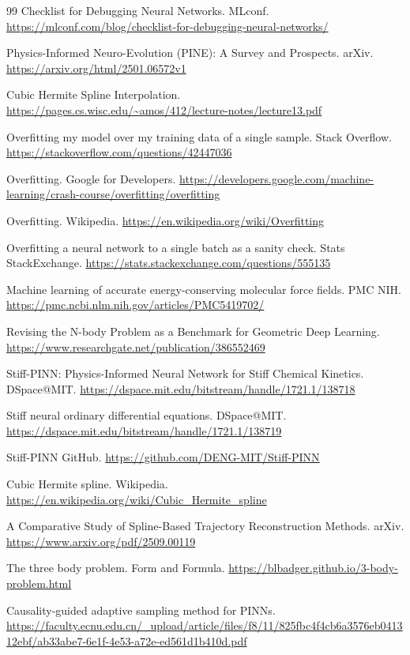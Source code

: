 \documentclass[11pt, a4paper]{article}
\begin{document}
\begin{thebibliography}{99}
 Checklist for Debugging Neural Networks. MLconf. \url{https://mlconf.com/blog/checklist-for-debugging-neural-networks/}

 Physics-Informed Neuro-Evolution (PINE): A Survey and Prospects. arXiv. \url{https://arxiv.org/html/2501.06572v1}

 Cubic Hermite Spline Interpolation. \url{https://pages.cs.wisc.edu/~amos/412/lecture-notes/lecture13.pdf}

 Overfitting my model over my training data of a single sample. Stack Overflow. \url{https://stackoverflow.com/questions/42447036}

 Overfitting. Google for Developers. \url{https://developers.google.com/machine-learning/crash-course/overfitting/overfitting}

 Overfitting. Wikipedia. \url{https://en.wikipedia.org/wiki/Overfitting}

 Overfitting a neural network to a single batch as a sanity check. Stats StackExchange. \url{https://stats.stackexchange.com/questions/555135}

 Machine learning of accurate energy-conserving molecular force fields. PMC NIH. \url{https://pmc.ncbi.nlm.nih.gov/articles/PMC5419702/}

 Revising the N-body Problem as a Benchmark for Geometric Deep Learning. \url{https://www.researchgate.net/publication/386552469}

 Stiff-PINN: Physics-Informed Neural Network for Stiff Chemical Kinetics. DSpace@MIT. \url{https://dspace.mit.edu/bitstream/handle/1721.1/138718}

 Stiff neural ordinary differential equations. DSpace@MIT. \url{https://dspace.mit.edu/bitstream/handle/1721.1/138719}

 Stiff-PINN GitHub. \url{https://github.com/DENG-MIT/Stiff-PINN}

 Cubic Hermite spline. Wikipedia. \url{https://en.wikipedia.org/wiki/Cubic_Hermite_spline}

 A Comparative Study of Spline-Based Trajectory Reconstruction Methods. arXiv. \url{https://www.arxiv.org/pdf/2509.00119}

 The three body problem. Form and Formula. \url{https://blbadger.github.io/3-body-problem.html}

 Causality-guided adaptive sampling method for PINNs. \url{https://faculty.ecnu.edu.cn/_upload/article/files/f8/11/825fbc4f4cb6a3576eb041312ebf/ab33abe7-6e1f-4e53-a72e-ed561d1b410d.pdf}


\end{thebibliography}
\end{document}
